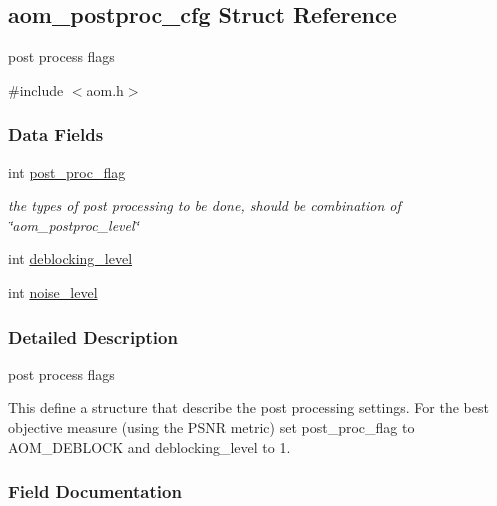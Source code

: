 \hypertarget{structaom__postproc__cfg}{}\subsection{aom\+\_\+postproc\+\_\+cfg Struct Reference}
\label{structaom__postproc__cfg}


post process flags  




{\ttfamily \#include $<$aom.\+h$>$}

\subsubsection*{Data Fields}
\begin{DoxyCompactItemize}
\item 
int \hyperlink{structaom__postproc__cfg_a47b934aabe66e2fd4ec2e95661a9d9fd}{post\+\_\+proc\+\_\+flag}\hypertarget{structaom__postproc__cfg_a47b934aabe66e2fd4ec2e95661a9d9fd}{}\label{structaom__postproc__cfg_a47b934aabe66e2fd4ec2e95661a9d9fd}

\begin{DoxyCompactList}\small\item\em the types of post processing to be done, should be combination of \char`\"{}aom\+\_\+postproc\+\_\+level\char`\"{} \end{DoxyCompactList}\item 
int \hyperlink{structaom__postproc__cfg_ae1137e5688f978994e88b231c72b5a63}{deblocking\+\_\+level}
\item 
int \hyperlink{structaom__postproc__cfg_aa68fb341be4d3de6d4feb66d3b659c26}{noise\+\_\+level}
\end{DoxyCompactItemize}


\subsubsection{Detailed Description}
post process flags 

This define a structure that describe the post processing settings. For the best objective measure (using the P\+S\+NR metric) set post\+\_\+proc\+\_\+flag to A\+O\+M\+\_\+\+D\+E\+B\+L\+O\+CK and deblocking\+\_\+level to 1. 

\subsubsection{Field Documentation}
